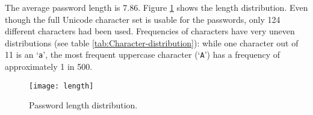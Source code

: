 \documentclass[a4paper,twocolumn]{article}
\providecommand{\tabularnewline}{\\}
\begin{document}
The average password length is 7.86. Figure \ref{fig:Password-length-distribution}
shows the length distribution. Even though the full Unicode character
set is usable for the passwords, only 124 different characters had
been used. Frequencies of characters have very uneven distributions
(see table \ref{tab:Character-distribution}): while one character
out of 11 is an `\texttt{a}', the most frequent uppercase character
(`\texttt{A}') has a frequency of approximately 1 in 500.

\begin{figure}
\begin{centering}
\texttt{[image: length]}
\par\end{centering}

\caption{\label{fig:Password-length-distribution}Password length distribution.}



\end{figure}


\begin{comment}
\begin{table}
\begin{centering}
\begin{tabular}{|c|c|c|}
\hline 
Length & \#passwords & Percentage\tabularnewline
\hline
\hline 
<= 4 & 407 & 4.37\%\tabularnewline
\hline 
5 & 468 & 5.02\%\tabularnewline
\hline 
6 & 2,020 & 21.68\%\tabularnewline
\hline 
7 & 1,533 & 16.45\%\tabularnewline
\hline 
8 & 2,181 & 23.41\%\tabularnewline
\hline 
9 & 931 & 9.99\%\tabularnewline
\hline 
10 & 659 & 7.07\%\tabularnewline
\hline 
11 & 408 & 4.38\%\tabularnewline
\hline 
>= 12 & 710 & 7.62\%\tabularnewline
\hline
\end{tabular}
\par\end{centering}

\caption{\label{tab:Password-length-distribution}Password length distribution.}

\end{table}

\end{comment}
{}
\end{document}
